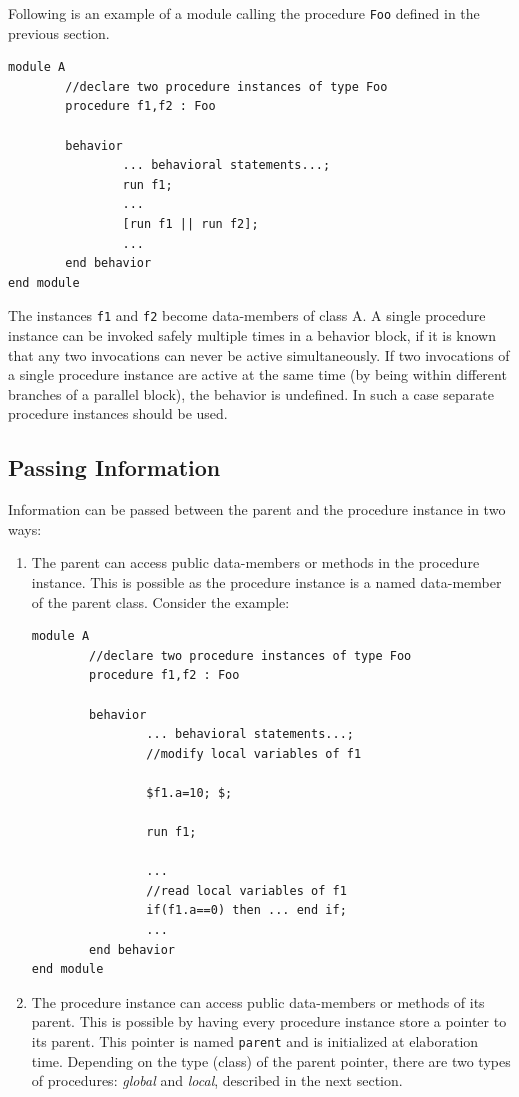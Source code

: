 \documentclass[12pt,a4paper]{report}
\begin{document}
	Following is an example of a module calling the procedure \texttt{Foo}
	defined in the previous section.
\begin{verbatim}
module A
        //declare two procedure instances of type Foo
        procedure f1,f2 : Foo

        behavior 
                ... behavioral statements...;
                run f1;
                ...
                [run f1 || run f2];
                ...
        end behavior
end module
\end{verbatim}
	The instances \texttt{f1} and \texttt{f2} become data-members
	of class A.	
	A single procedure instance can be invoked safely multiple times in a
	behavior block, if it is known that any two invocations can never be
	active simultaneously.  If two invocations of a single procedure
	instance are active at the same time (by being within different branches
	of a parallel block), the behavior is undefined.
	In such a case separate procedure instances should be used.


	\subsection{Passing Information}
	Information can be passed between the parent and the procedure instance
	in two ways:
	\begin{enumerate}
	\item The parent can access public data-members or methods 
	in the procedure instance.  This is possible as the procedure instance is a named
	data-member of the parent class.  Consider the example:
	\begin{verbatim}
module A
        //declare two procedure instances of type Foo
        procedure f1,f2 : Foo

        behavior 
                ... behavioral statements...;
                //modify local variables of f1
                
				$f1.a=10; $;

                run f1;
                
				...
                //read local variables of f1
                if(f1.a==0) then ... end if;
                ...
        end behavior
end module
\end{verbatim}
	\item The procedure instance can access public data-members or methods of
	its parent. This is possible by having every procedure instance store a 
	pointer to its parent. This pointer is named \texttt{parent} and is initialized
	at elaboration time. Depending on the type (class) of the parent pointer, there
	are two types of procedures: \emph{global} and \emph{local}, described in the next
	section.
	\end{enumerate}
\end{document}
